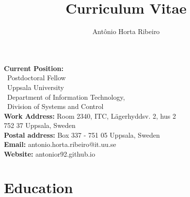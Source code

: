 \documentclass[10pt,letterpaper]{article} %
\title{Curriculum Vitae}
\author{Ant\^onio Horta Ribeiro}
\begin{document}
\maketitle

\begin{tcolorbox}[standard jigsaw, opacityback=0]
    \vspace{-4pt}
\begin{multicols}{2}
    \small
    \textbf{Current Position:}\\
    \, Postdoctoral Fellow\\
    \, Uppsala University \\
    \, Department of Information Technology,\\
    \, Division of Systems and Control\\
    {\bf Work Address:} Room 2340, ITC, Lägerhyddsv. 2, hus 2 \\
    \phantom{\bf Work address:} 752 37 Uppsala, Sweden\\
    {\bf Postal address:} Box 337 - 751 05 Uppsala, Sweden\\
    {\bf Email:} antonio.horta.ribeiro@it.uu.se\\
    {\bf Website:} antonior92.github.io
\end{multicols}
\end{tcolorbox}


\section*{Education} %
\end{document}
